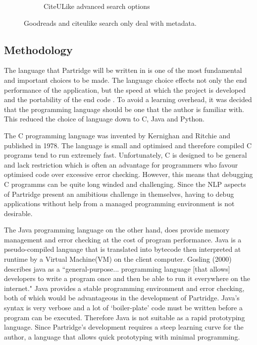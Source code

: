 \documentclass[12pt,a4paper]{article}
\begin{document}
\begin{figure}[!hbt]
\begin{subfigure}[b]{0.50\textwidth}
                \caption{CiteULike advanced search options}
                \label{fig:citeulike_search}
        \end{subfigure}

        \caption{Goodreads and citeulike search only deal with metadata.}
        \label{fig:social_searches}
\end{figure}


\subsection{Methodology}

The language that Partridge will be written in is one of the most fundamental
and important choices to be made. The language choice effects not only the end
performance of the application, but the speed at which the project is developed
and the portability of the end code \cite{britton2008}. To avoid a learning
overhead, it was decided that the programming language should be one that the
author is familiar with. This reduced the choice of language down to C, Java
and Python. 

The C programming language was invented by Kernighan and Ritchie and
published in 1978\cite{ritchie1978c}. The language is small and
optimised\cite{prinz2002c} and therefore compiled C programs tend to run
extremely fast. Unfortunately, C is designed to be general and lack restriction
\cite{ricthie1978c} which is often an advantage for programmers who favour
optimised code over excessive error checking. However, this means that
debugging C programms can be quite long winded and challenging. Since the NLP
aspects of Partridge present an amibitious challenge in themselves, having to
debug applications without help from a managed programming environment is not
desirable. 

The Java programming language on the other hand, does provide memory management
and error checking\cite{Coffey2008} at the cost of program performance. Java is
a pseudo-compiled language that is translated into bytecode then interpreted at
runtime by a Virtual Machine(VM) on the client computer. Gosling (2000)
describes java as a ``general-purpose...  programming language [that allows]
developers to write a program once and then be able to run it everywhere on the
internet\cite{gosling2000java}." Java provides a stable programming environment
and error checking, both of which would be advantageous in the development of
Partridge. Java's syntax is very verbose and a lot of `boiler-plate' code must
be written before a program can be executed.  Therefore Java is not suitable as
a rapid prototyping language. Since Partridge's development requires a steep
learning curve for the author, a language that allows quick prototyping with
minimal programming.
\end{document}
